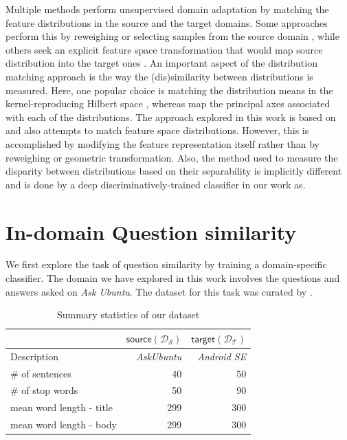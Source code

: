 \documentclass{sigkddExp}
\begin{document}
Multiple methods perform unsupervised domain adaptation by matching the feature distributions in the source and the target domains. Some approaches perform this by reweighing or selecting samples from the source domain  \cite{borgwardt2006integrating, huang2007correcting, gong2012geodesic}, while others seek an explicit feature space transformation that would map source distribution into the target ones \cite{pan2011domain, gopalan2011domain, baktashmotlagh2013unsupervised}. An important  aspect of the distribution matching approach is the way the (dis)similarity between distributions is measured. Here, one popular choice is matching the distribution means in the kernel-reproducing Hilbert space \cite{borgwardt2006integrating, huang2007correcting}, whereas \cite{gong2012geodesic, fernando2013unsupervised} map the principal axes associated with each of the distributions. The approach explored in this work is based on \cite{ganin2015unsupervised} and also attempts to match feature space distributions. However, this is accomplished by modifying the feature representation itself rather than by reweighing or geometric transformation. Also, the method used to measure the disparity between distributions based on their separability is implicitly different and is done by a deep discriminatively-trained classifier in our work as.


\section{In-domain Question similarity}
\label{in_domain}
We first explore the task of question similarity by training a domain-specific classifier. The domain we have explored in this work involves the questions and answers asked on \textit{Ask Ubuntu}. The dataset for this task was curated by \cite{lei2015semi}. 

\begin{table}[h]
\begin{tabular}{l|r|r}
     
     & $\mathsf{source} (\mathcal{D_S})$
     & $\mathsf{target} (\mathcal{D_T})$
     \\
     \toprule
     Description
     & \textit{AskUbuntu}
     & \textit{Android SE}
     \\
     \# of sentences
     & 40
     & 50
     \\
     \# of stop words 
     & 50
     & 90
     \\
     mean word length - title
     & 299
     & 300
     \\
     mean word length - body
     & 299
     & 300
\end{tabular}
\caption{Summary statistics of our dataset}
\label{tab:dataset}
\end{table}
\end{document}
